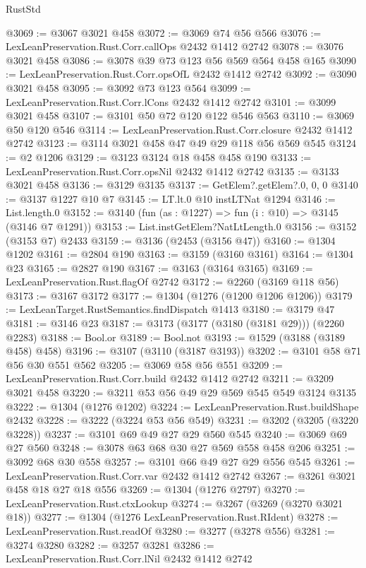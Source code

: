 \begin{lexlean}{RustStd}
\begin{coremodule}
@3069 := @3067 @3021 @458
@3072 := @3069 @74 @56 @566
@3076 := LexLeanPreservation.Rust.Corr.callOps @2432 @1412 @2742
@3078 := @3076 @3021 @458
@3086 := @3078 @39 @73 @123 @56 @569 @564 @458 @165
@3090 := LexLeanPreservation.Rust.Corr.opsOfL @2432 @1412 @2742
@3092 := @3090 @3021 @458
@3095 := @3092 @73 @123 @564
@3099 := LexLeanPreservation.Rust.Corr.lCons @2432 @1412 @2742
@3101 := @3099 @3021 @458
@3107 := @3101 @50 @72 @120 @122 @546 @563
@3110 := @3069 @50 @120 @546
@3114 := LexLeanPreservation.Rust.Corr.closure @2432 @1412 @2742
@3123 := @3114 @3021 @458 @47 @49 @29 @118 @56 @569 @545
@3124 := @2 @1206
@3129 := @3123 @3124 @18 @458 @458 @190
@3133 := LexLeanPreservation.Rust.Corr.opsNil @2432 @1412 @2742
@3135 := @3133 @3021 @458
@3136 := @3129 @3135
@3137 := GetElem?.getElem?.{0, 0, 0}
@3140 := @3137 @1227 @10 @7
@3145 := LT.lt.{0} @10 instLTNat @1294
@3146 := List.length.{0}
@3152 := @3140 (fun (as : @1227) => fun (i : @10) => @3145 (@3146 @7 @1291))
@3153 := List.instGetElem?NatLtLength.{0}
@3156 := @3152 (@3153 @7) @2433
@3159 := @3136 (@2453 (@3156 @47))
@3160 := @1304 @1202
@3161 := @2804 @190
@3163 := @3159 (@3160 @3161)
@3164 := @1304 @23
@3165 := @2827 @190
@3167 := @3163 (@3164 @3165)
@3169 := LexLeanPreservation.Rust.flagOf @2742
@3172 := @2260 (@3169 @118 @56)
@3173 := @3167 @3172
@3177 := @1304 (@1276 (@1200 @1206 @1206))
@3179 := LexLeanTarget.RustSemantics.findDispatch @1413
@3180 := @3179 @47
@3181 := @3146 @23
@3187 := @3173 (@3177 (@3180 (@3181 @29))) (@2260 @2283)
@3188 := Bool.or
@3189 := Bool.not
@3193 := @1529 (@3188 (@3189 @458) @458)
@3196 := @3107 (@3110 (@3187 @3193))
@3202 := @3101 @58 @71 @56 @30 @551 @562
@3205 := @3069 @58 @56 @551
@3209 := LexLeanPreservation.Rust.Corr.build @2432 @1412 @2742
@3211 := @3209 @3021 @458
@3220 := @3211 @53 @56 @49 @29 @569 @545 @549 @3124 @3135
@3222 := @1304 (@1276 @1202)
@3224 := LexLeanPreservation.Rust.buildShape @2432
@3228 := @3222 (@3224 @53 @56 @549)
@3231 := @3202 (@3205 (@3220 @3228))
@3237 := @3101 @69 @49 @27 @29 @560 @545
@3240 := @3069 @69 @27 @560
@3248 := @3078 @63 @68 @30 @27 @569 @558 @458 @206
@3251 := @3092 @68 @30 @558
@3257 := @3101 @66 @49 @27 @29 @556 @545
@3261 := LexLeanPreservation.Rust.Corr.var @2432 @1412 @2742
@3267 := @3261 @3021 @458 @18 @27 @18 @556
@3269 := @1304 (@1276 @2797)
@3270 := LexLeanPreservation.Rust.ctxLookup
@3274 := @3267 (@3269 (@3270 @3021 @18))
@3277 := @1304 (@1276 LexLeanPreservation.Rust.RIdent)
@3278 := LexLeanPreservation.Rust.readOf
@3280 := @3277 (@3278 @556)
@3281 := @3274 @3280
@3282 := @3257 @3281
@3286 := LexLeanPreservation.Rust.Corr.lNil @2432 @1412 @2742

\end{coremodule}
\end{lexlean}
